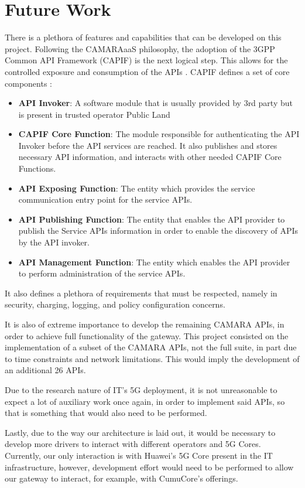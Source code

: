 \chapter{Future Work}

There is a plethora of features and capabilities that can be
developed on this project. Following the CAMARAaaS philosophy,
the adoption of the 3GPP Common API Framework (CAPIF) is the next logical
step. This allows for the controlled exposure and consumption of
the APIs \cite{CAMARAaaS}. CAPIF defines a set of core components
\cite{CAPIF}:

\begin{itemize} \item \textbf{API Invoker}: A software module
	      that is usually provided by 3rd party but is present in
	      trusted operator Public Land

	\item \textbf{CAPIF Core Function}: The module responsible
	      for authenticating the API Invoker before the API services
	      are reached. It also publishes and stores necessary API
	      information, and interacts with other needed CAPIF Core
	      Functions.

	\item \textbf{API Exposing Function}: The entity which
	      provides the service communication entry point for the
	      service APIs.

	\item \textbf{API Publishing Function}: The entity that
	      enables the API provider to publish the Service APIs
	      information in order to enable the discovery of APIs by the
	      API invoker.

	\item \textbf{API Management Function}: The entity which
	      enables the API provider to perform administration of the
	      service APIs.

\end{itemize}

It also defines a plethora of requirements that must be respected, namely in
security, charging, logging, and policy configuration concerns.


It is also of extreme importance to develop the remaining CAMARA APIs, in order
to achieve full functionality of the gateway. This project consisted on the
implementation of a subset of the CAMARA APIs, not the full suite, in part due
to time constraints and network limitations. This would imply the development
of an additional 26 APIs.

Due to the research nature of IT's 5G deployment, it is not unreasonable to
expect a lot of auxiliary work once again, in order to implement said APIs, so
that is something that would also need to be performed.

Lastly, due to the way our architecture is laid out, it would be necessary to
develop more drivers to interact with different operators and 5G Cores.
Currently, our only interaction is with Huawei's 5G Core present in the IT
infrastructure, however, development effort would need to be performed to allow
our gateway to interact, for example, with CumuCore's offerings.
